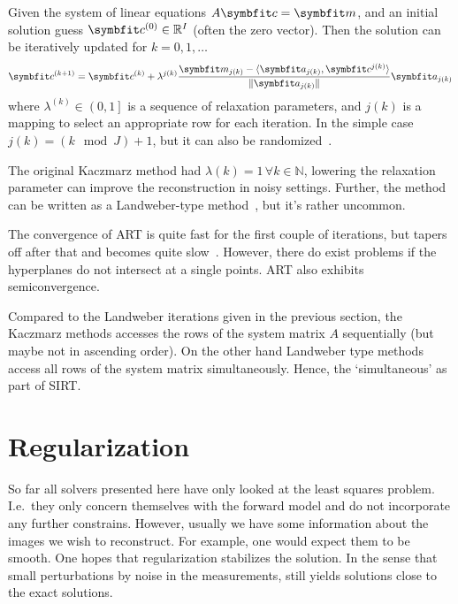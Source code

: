 \begin{definition}\label{def:art}
	Given the system of linear equations \(A\mvec{c} = \mvec{m}\), and an initial solution guess
	\(\mvec{c}^{(0)} \in \mathbb{R}^I\) (often the zero vector). Then the solution can be
	iteratively updated for
	\(k = 0, 1, \dots\)
	\[
		\mvec{c}^{(k+1)} = \mvec{c}^{(k)} + \lambda^{j(k)} \frac{\mvec{m}_{j(k)} - \langle \mvec{a}_{j(k)}, \mvec{c}^{j(k)} \rangle}{\norm{\mvec{a}_{j(k)}}}\mvec{a}_{j(k)}
	\]
	where \(\lambda^{(k)} \in \left(0, 1\right]\) is a sequence of relaxation parameters, and
	\(j(k)\) is a mapping to select an appropriate row for each iteration. In the simple case
	\(j(k) = (k \mod J) + 1\), but it can also be randomized~\cite{strohmer_randomized_2007}.
\end{definition}

The original Kaczmarz method had \(\lambda(k) = 1\, \forall k \in \mathbb{N}\), lowering the
relaxation parameter can improve the reconstruction in noisy settings. Further, the method can be
written as a Landweber-type method~\cite{hansen_discrete_2010}, but it's rather uncommon.

The convergence of \gls{ART} is quite fast for the first couple of iterations, but tapers off after
that and becomes quite slow~\cite{hansen_discrete_2010}. However, there do exist problems if the
hyperplanes do not intersect at a single points. \gls{ART} also exhibits semiconvergence.

Compared to the Landweber iterations given in the previous section, the Kaczmarz methods accesses
the rows of the system matrix \(A\) sequentially (but maybe not in ascending order). On the other
hand Landweber type methods access all rows of the system matrix simultaneously. Hence, the
`simultaneous' as part of \gls{SIRT}\@.

\section{Regularization}\label{sec:regularization}

So far all solvers presented here have only looked at the least squares problem. I.e.\ they only
concern themselves with the forward model and do not incorporate any further constrains. However,
usually we have some information about the images we wish to reconstruct. For example, one would
expect them to be smooth. One hopes that regularization stabilizes the solution. In the sense that
small perturbations by noise in the measurements, still yields solutions close to the exact
solutions.

